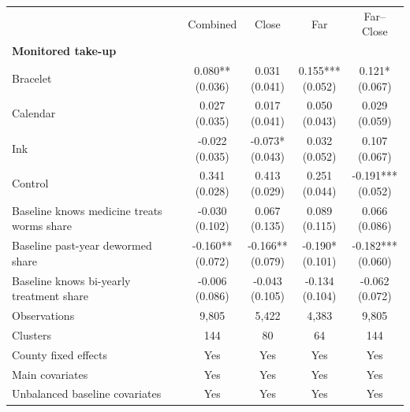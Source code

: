 \begin{tabular}{lcccc}
\toprule
 & Combined & Close & Far & Far--Close \\
\multicolumn{5}{l}{\textbf{Monitored take-up}} \\
\addlinespace[0.2em]
Bracelet & \makecell[c]{0.080**\\{(0.036)}} & \makecell[c]{0.031\\{(0.041)}} & \makecell[c]{0.155***\\{(0.052)}} & \makecell[c]{0.121*\\{(0.067)}} \\
Calendar & \makecell[c]{0.027\\{(0.035)}} & \makecell[c]{0.017\\{(0.041)}} & \makecell[c]{0.050\\{(0.043)}} & \makecell[c]{0.029\\{(0.059)}} \\
Ink & \makecell[c]{-0.022\\{(0.035)}} & \makecell[c]{-0.073*\\{(0.043)}} & \makecell[c]{0.032\\{(0.052)}} & \makecell[c]{0.107\\{(0.067)}} \\
Control & \makecell[c]{0.341\\{(0.028)}} & \makecell[c]{0.413\\{(0.029)}} & \makecell[c]{0.251\\{(0.044)}} & \makecell[c]{-0.191***\\{(0.052)}} \\
\addlinespace[0.3em]
Baseline knows medicine treats worms share & \makecell[c]{-0.030\\{(0.102)}} & \makecell[c]{0.067\\{(0.135)}} & \makecell[c]{0.089\\{(0.115)}} & \makecell[c]{0.066\\{(0.086)}} \\
Baseline past-year dewormed share & \makecell[c]{-0.160**\\{(0.072)}} & \makecell[c]{-0.166**\\{(0.079)}} & \makecell[c]{-0.190*\\{(0.101)}} & \makecell[c]{-0.182***\\{(0.060)}} \\
Baseline knows bi-yearly treatment share & \makecell[c]{-0.006\\{(0.086)}} & \makecell[c]{-0.043\\{(0.105)}} & \makecell[c]{-0.134\\{(0.104)}} & \makecell[c]{-0.062\\{(0.072)}} \\
\addlinespace[0.3em]
Observations & 9,805 & 5,422 & 4,383 & 9,805 \\
Clusters & 144 & 80 & 64 & 144 \\
County fixed effects & Yes & Yes & Yes & Yes \\
Main covariates & Yes & Yes & Yes & Yes \\
Unbalanced baseline covariates & Yes & Yes & Yes & Yes \\
\bottomrule
\end{tabular}

